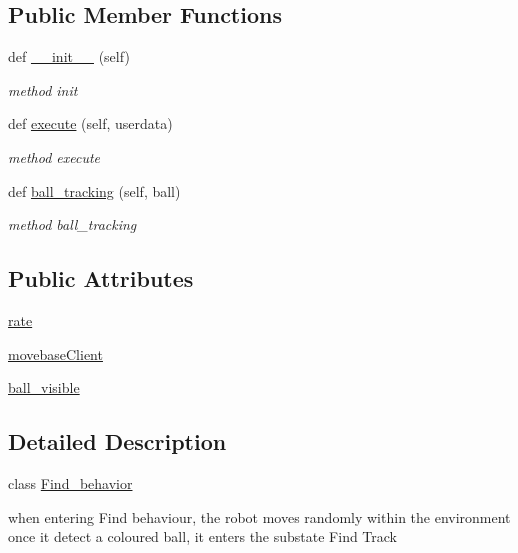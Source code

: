 \subsection*{Public Member Functions}
\begin{DoxyCompactItemize}
\item 
def \hyperlink{classbehavior__manager_1_1Find__behavior_a38692d816780c602e287a4331cb99a98}{\+\_\+\+\_\+init\+\_\+\+\_\+} (self)
\begin{DoxyCompactList}\small\item\em method init \end{DoxyCompactList}\item 
def \hyperlink{classbehavior__manager_1_1Find__behavior_af12b4ba2e8206c80f55f147c9eb58dc2}{execute} (self, userdata)
\begin{DoxyCompactList}\small\item\em method execute \end{DoxyCompactList}\item 
def \hyperlink{classbehavior__manager_1_1Find__behavior_a092d9fc8598a11ea31c47f07b01e984c}{ball\+\_\+tracking} (self, ball)
\begin{DoxyCompactList}\small\item\em method ball\+\_\+tracking \end{DoxyCompactList}\end{DoxyCompactItemize}
\subsection*{Public Attributes}
\begin{DoxyCompactItemize}
\item 
\hyperlink{classbehavior__manager_1_1Find__behavior_a3671a945907edc316dcc8dd00a219268}{rate}
\item 
\hyperlink{classbehavior__manager_1_1Find__behavior_a45d5bea7497f4a68cf3feb3ba6eb2b19}{movebase\+Client}
\item 
\hyperlink{classbehavior__manager_1_1Find__behavior_aa36ffbc4705c25c0ec23ff688f72b46f}{ball\+\_\+visible}
\end{DoxyCompactItemize}


\subsection{Detailed Description}
class \hyperlink{classbehavior__manager_1_1Find__behavior}{Find\+\_\+behavior} 

when entering Find behaviour, the robot moves randomly within the environment once it detect a coloured ball, it enters the substate Find Track 

